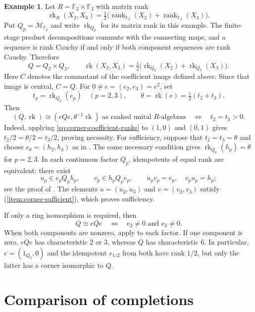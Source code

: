 \documentclass[11pt]{amsart}
\DeclareMathOperator{\rk}{rk}
\theoremstyle{definition}
\newtheorem{example}[theorem]{Example}
\theoremstyle{remark}
\begin{document}
\begin{example}\label{ex:product-corner-classification}
Let $R=\mathbb F_2\times\mathbb F_3$ with matrix rank
\[
 \rk_R(X_2,X_3)
 =\tfrac12\bigl(\operatorname{rank}_{\mathbb F_2}(X_2)+\operatorname{rank}_{\mathbb F_3}(X_3)\bigr).
\]
Put $Q_p=\mathcal M_{\mathbb F_p}$ and write $\rk_{Q_p}$ for its matrix rank
in this example.  The finite-stage product decompositions commute
with the connecting maps, and a sequence is rank Cauchy if and only if
both component sequences are rank Cauchy.  Therefore
\[
 Q=Q_2\times Q_3,\qquad
 \rk(X_2,X_3)=\tfrac12\bigl(\rk_{Q_2}(X_2)+\rk_{Q_3}(X_3)\bigr).
\]
Here $C$ denotes the commutant of the coefficient image defined
above.  Since that image is central, $C=Q$.
For $0\ne e=(e_2,e_3)=e^2$, set
\[
 t_p=\rk_{Q_p}(e_p)\quad(p=2,3),\qquad
 \theta=\rk(e)=\tfrac12(t_2+t_3).
\]
Then
\begin{equation}\label{eq:product-corner-criterion}
 (Q,\rk)\cong(eQe,\theta^{-1}\rk)
 \text{ as ranked unital }R\text{-algebras}
 \quad\Longleftrightarrow\quad t_2=t_3>0.
\end{equation}
Indeed, applying \eqref{eq:corner-coefficient-ranks} to $(1,0)$ and
$(0,1)$ gives $t_2/2=\theta/2=t_3/2$, proving necessity.
For sufficiency, suppose that $t_2=t_3=\theta$ and choose
$e_\theta=(h_2,h_3)$ as in .
The same necessary condition gives $\rk_{Q_p}(h_p)=\theta$ for $p=2,3$.
In each continuous factor $Q_p$, idempotents of equal rank are
equivalent: there exist
\[
 u_p\in e_pQ_ph_p,\qquad v_p\in h_pQ_pe_p,
 \qquad u_pv_p=e_p,\quad v_pu_p=h_p;
\]
see the proof of \cite[Lemma~4(ii)]{Halperin1968}.
The elements $u=(u_2,u_3)$ and $v=(v_2,v_3)$ satisfy
(\ref{item:corner-sufficient}),
which proves sufficiency.

If only a ring isomorphism is required, then
\[
 Q\cong eQe\quad\Longleftrightarrow\quad e_2\ne0\text{ and }e_3\ne0.
\]
When both components are nonzero, apply
\cite[Theorem~2]{Halperin1968} to each factor.
If one component is zero, $eQe$ has characteristic $2$ or $3$,
whereas $Q$ has characteristic $6$.
In particular, $e=(1_{Q_2},0)$ and the idempotent $e_{1/2}$ from
 both have rank $1/2$, but only the
latter has a corner isomorphic to $Q$.
\end{example}

\section{Comparison of completions}
\label{sec:af-completions}
\end{document}
